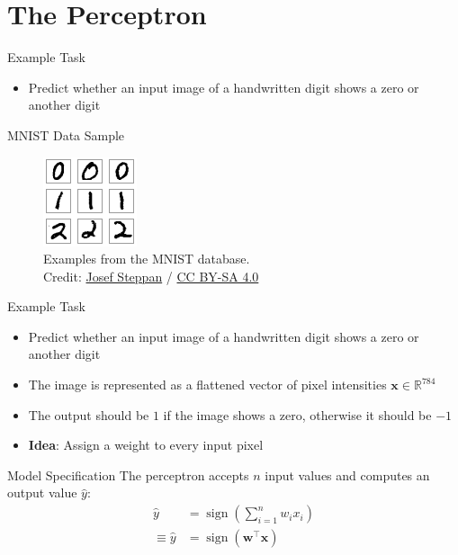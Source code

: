 \documentclass{beamer}
\DeclareMathOperator{\sign}{sign}
\begin{document}
	\section{The Perceptron}
	\begin{frame}{Example Task}
		\begin{itemize}
			\item<1-> Predict whether an input image of a handwritten digit shows a zero or another digit
		\end{itemize}
	\end{frame}
	\begin{frame}{MNIST Data Sample}
		\begin{figure}
			\includegraphics[scale=1.6]{img/mnist}
			\caption{Examples from the {MNIST} database. \\Credit: 
				\href{https://commons.wikimedia.org/wiki/File:MnistExamples.png}{Josef Steppan}
				/ \href{https://creativecommons.org/licenses/by-sa/4.0/deed.en}{CC BY-SA 4.0}}
		\end{figure}
	\end{frame}
	\begin{frame}{Example Task}
		\begin{itemize}
			\item <1-> Predict whether an input image of a handwritten digit shows a zero or another digit
			\item <1-> The image is represented as a flattened vector of pixel intensities $\bm{x} \in \mathbb{R}^{784}$
			\item <2-> The output should be $1$ if the image shows a zero, otherwise it should be $-1$
			\item <3-> \textbf{Idea}: Assign a weight to every input pixel
		\end{itemize}
	\end{frame}
	\begin{frame}{Model Specification}
		The perceptron accepts $n$ input values and computes an output value $\hat{y}$:
		\begin{equation}
			\begin{split}
			\hat{y} &= \sign\left (\sum_{i=1}^{n} w_ix_i\right )\\
			\equiv \hat{y} &= \sign(\bm{w}^\top\bm{x})
			\end{split}
		\end{equation}
	\end{frame}
\end{document}
